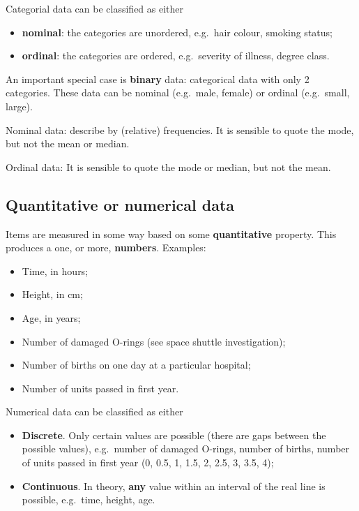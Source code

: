 \documentclass[
  11pt,
  british,
  openany, a4paper]{book}
\providecommand{\tightlist}{%
  \setlength{\itemsep}{0pt}\setlength{\parskip}{0pt}}
\begin{document}
Categorial data can be classified as either

\begin{itemize}
\tightlist
\item
  \textbf{nominal}: the categories are unordered, e.g.~hair colour, smoking status;
\item
  \textbf{ordinal}: the categories are ordered, e.g.~severity of illness, degree class.
\end{itemize}

An important special case is \textbf{binary} data: categorical data with only 2 categories. These data can be nominal (e.g.~male, female) or ordinal (e.g.~small, large).

Nominal data: describe by (relative) frequencies. It is sensible to quote the mode, but not the mean or median.

Ordinal data: It is sensible to quote the mode or median, but not the mean.

\hypertarget{quantitative-or-numerical-data}{%
\subsection{Quantitative or numerical data}\label{quantitative-or-numerical-data}}

Items are measured in some way based on some \textbf{quantitative} property. This produces a one, or more, \textbf{numbers}. Examples:

\begin{itemize}
\tightlist
\item
  Time, in hours;
\item
  Height, in cm;
\item
  Age, in years;
\item
  Number of damaged O-rings (see space shuttle investigation);
\item
  Number of births on one day at a particular hospital;
\item
  Number of units passed in first year.
\end{itemize}

Numerical data can be classified as either

\begin{itemize}
\tightlist
\item
  \textbf{Discrete}. Only certain values are possible (there are gaps between the possible values), e.g.~number of damaged O-rings, number of births, number of units passed in first year (0, 0.5, 1, 1.5, 2, 2.5, 3, 3.5, 4);
\item
  \textbf{Continuous}. In theory, \textbf{any} value within an interval of the real line
  is possible, e.g.~time, height, age.
\end{itemize}
\end{document}
